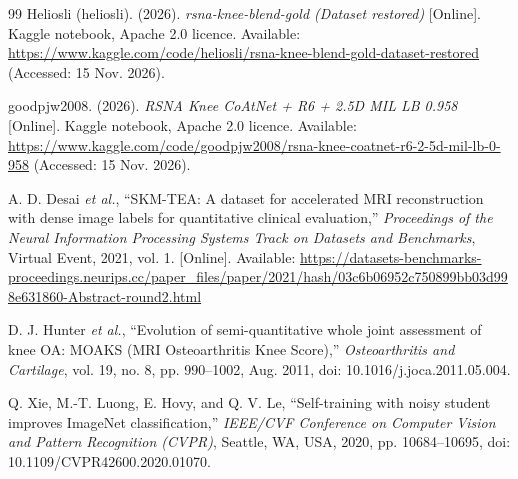 \begin{thebibliography}{99}
 Heliosli (heliosli). (2026). \textit{rsna-knee-blend-gold (Dataset restored)} [Online]. Kaggle notebook, Apache 2.0 licence. Available: \url{https://www.kaggle.com/code/heliosli/rsna-knee-blend-gold-dataset-restored} (Accessed: 15 Nov. 2026).

 goodpjw2008. (2026). \textit{RSNA Knee \textbar{} CoAtNet + R6 + 2.5D MIL \textbar{} LB 0.958} [Online]. Kaggle notebook, Apache 2.0 licence. Available: \url{https://www.kaggle.com/code/goodpjw2008/rsna-knee-coatnet-r6-2-5d-mil-lb-0-958} (Accessed: 15 Nov. 2026).

 A. D. Desai \textit{et al.}, ``SKM-TEA: A dataset for accelerated MRI reconstruction with dense image labels for quantitative clinical evaluation,'' \textit{Proceedings of the Neural Information Processing Systems Track on Datasets and Benchmarks}, Virtual Event, 2021, vol. 1. [Online]. Available: \url{https://datasets-benchmarks-proceedings.neurips.cc/paper_files/paper/2021/hash/03c6b06952c750899bb03d998e631860-Abstract-round2.html}

 D. J. Hunter \textit{et al.}, ``Evolution of semi-quantitative whole joint assessment of knee OA: MOAKS (MRI Osteoarthritis Knee Score),'' \textit{Osteoarthritis and Cartilage}, vol. 19, no. 8, pp. 990--1002, Aug. 2011, doi: 10.1016/j.joca.2011.05.004.

 Q. Xie, M.-T. Luong, E. Hovy, and Q. V. Le, ``Self-training with noisy student improves ImageNet classification,'' \textit{IEEE/CVF Conference on Computer Vision and Pattern Recognition (CVPR)}, Seattle, WA, USA, 2020, pp. 10684--10695, doi: 10.1109/CVPR42600.2020.01070.

\end{thebibliography}
\endgroup

